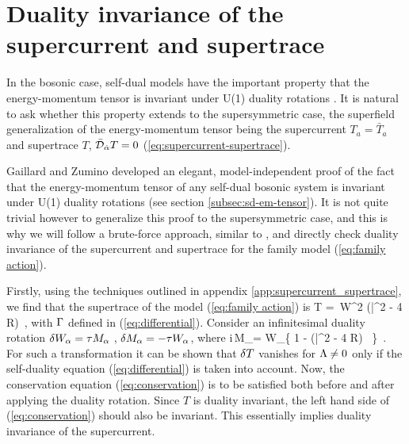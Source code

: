 \vskip0.5cm
\section{Duality invariance of the supercurrent and supertrace}
\noindent In the bosonic case, self-dual models have the important property that the energy-momentum tensor is invariant under U(1) duality rotations \cite{Gaillard:1981rj,Gaillard:1997rt,Gibbons:1995ap,Gibbons:1995cv,Schrodinger:1935}. It is natural to ask whether this property extends to the supersymmetric case, the superfield generalization of the energy-momentum tensor being the supercurrent $T_a = {\bar T}_a$ and supertrace $T$, ${\bar {{\cal D}}}_{\dot{\alpha}} T=0$ (\ref{eq:supercurrent-supertrace}).

Gaillard and Zumino \cite{Gaillard:1981rj,Gaillard:1997rt} developed an elegant, model-independent proof of the fact that the energy-momentum tensor of any self-dual bosonic system is invariant under U(1) duality rotations (see section \ref{subsec:sd-em-tensor}). It is not quite trivial however to generalize this proof to the supersymmetric case, and this is why we will follow a brute-force approach, similar to \cite{Gibbons:1995ap,Gibbons:1995cv,Schrodinger:1935}, and directly check duality invariance of the supercurrent and supertrace for the family model (\ref{eq:family action}).

Firstly, using the techniques outlined in appendix \ref{app:supercurrent_supertrace}, we find that the supertrace of the model (\ref{eq:family action}) is
\be
\label{eq:supertrace}
T = \,W^2 {({\bar \cD}^2 - 4 R)}\!~,
\ee
with $\Gamma$ defined in (\ref{eq:differential}). Consider an infinitesimal duality rotation $\delta W_\alpha = \tau M_\alpha~$, $\delta M_\alpha = -\tau W_\alpha$, where
\be
\label{eq:familyM}
{\rm i}\,M_\a = W_\a \left\{ 1 -  {({\bar \cD}^2 - 4 R)}\! \,
 \right\}~.
\ee
For such a transformation it can be shown that $\delta T$ vanishes for $\Lambda \neq 0$ only if the self-duality equation (\ref{eq:differential}) is taken into account. Now, the conservation equation (\ref{eq:conservation}) is to be satisfied both before and after applying the duality rotation. Since $T$ is duality invariant, the left hand side of (\ref{eq:conservation}) should also be invariant. This essentially implies duality invariance of the supercurrent.


